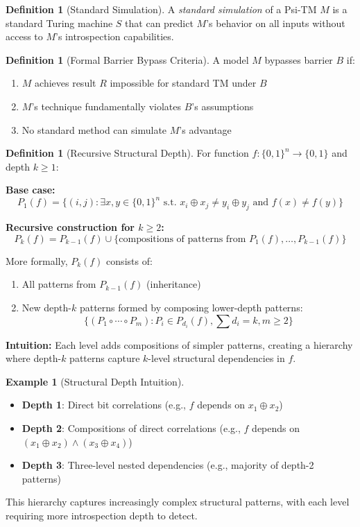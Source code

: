 \documentclass[11pt]{article}
\theoremstyle{definition}
\newtheorem{definition}[theorem]{Definition}
\newtheorem{example}[theorem]{Example}
\begin{document}
\begin{definition}[Standard Simulation]
A \textit{standard simulation} of a Psi-TM $M$ is a standard Turing machine $S$ that can predict $M$'s behavior on all inputs without access to $M$'s introspection capabilities.
\end{definition}

\begin{definition}[Formal Barrier Bypass Criteria]
A model $M$ bypasses barrier $B$ if:
\begin{enumerate}
\item $M$ achieves result $R$ impossible for standard TM under $B$
\item $M$'s technique fundamentally violates $B$'s assumptions
\item No standard method can simulate $M$'s advantage
\end{enumerate}
\end{definition}

\begin{definition}[Recursive Structural Depth]
For function $f: \{0,1\}^n \to \{0,1\}$ and depth $k \geq 1$:

\textbf{Base case:}
$$P_1(f) = \{(i,j) : \exists x,y \in \{0,1\}^n \text{ s.t. } x_i \oplus x_j \neq y_i \oplus y_j \text{ and } f(x) \neq f(y)\}$$

\textbf{Recursive construction for $k \geq 2$:}
$$P_k(f) = P_{k-1}(f) \cup \{\text{compositions of patterns from } P_1(f), \ldots, P_{k-1}(f)\}$$

More formally, $P_k(f)$ consists of:
\begin{enumerate}
\item All patterns from $P_{k-1}(f)$ (inheritance)
\item New depth-$k$ patterns formed by composing lower-depth patterns:
   $$\{(P_1 \circ \cdots \circ P_m) : P_i \in P_{d_i}(f), \sum d_i = k, m \geq 2\}$$
\end{enumerate}

\textbf{Intuition:} Each level adds compositions of simpler patterns, creating a hierarchy where depth-$k$ patterns capture $k$-level structural dependencies in $f$.
\end{definition}

\begin{example}[Structural Depth Intuition]
\begin{itemize}
\item \textbf{Depth 1}: Direct bit correlations (e.g., $f$ depends on $x_1 \oplus x_2$)
\item \textbf{Depth 2}: Compositions of direct correlations (e.g., $f$ depends on $(x_1 \oplus x_2) \wedge (x_3 \oplus x_4)$)
\item \textbf{Depth 3}: Three-level nested dependencies (e.g., majority of depth-2 patterns)
\end{itemize}
This hierarchy captures increasingly complex structural patterns, with each level requiring more introspection depth to detect.
\end{example}
\end{document}
